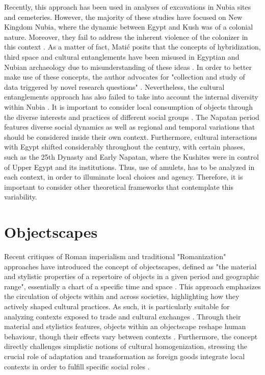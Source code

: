 Recently, this approach has been used in analyses of excavations in Nubia sites and cemeteries. However, the majority of these studies have focused on New Kingdom Nubia, where the dynamic between Egypt and Kush was of a colonial nature. Moreover, they fail to address the inherent violence of the colonizer in this context \parencite[p.~72-73]{matićPostcolonialismReverseDiscourse2023}. As a matter of fact, Matić posits that the concepts of hybridization, third space and cultural entanglements have been misused in Egyptian and Nubian archaeology due to misunderstanding of these ideas \parencite[p.~61, 74]{matićPostcolonialismReverseDiscourse2023}. In order to better make use of these concepts, the author advocates for "collection and study of data triggered by novel research questions" \parencite[p.~74]{matićPostcolonialismReverseDiscourse2023}. Nevertheless, the cultural entanglements approach has also failed to take into account the internal diversity within Nubia \parencites[p.~5]{lemosMaterialCultureColonization2020}. It is important to consider local consumption of objects through the diverse interests and practices of different social groups \parencites[p.~57]{dietlerConsumption2010}. The Napatan period features diverse social dynamics as well as regional and temporal variations that should be considered inside their own context. Furthermore, cultural interactions with Egypt shifted considerably throughout the century, with certain phases, such as the 25th Dynasty and Early Napatan, where the Kushites were in control of Upper Egypt and its institutions. Thus, use of amulets, has to be analyzed in each context, in order to illuminate local choices and agency. Therefore, it is important to consider other theoretical frameworks that contemplate this variability.


\section{Objectscapes}


Recent critiques of Roman imperialism and traditional "Romanization" approaches have introduced the concept of objectscapes, defined as "the material and stylistic properties of a repertoire of objects in a given period and geographic range", essentially a chart of a specific time and space \parencites[p.~368]{pittsObjectscapesManifestoInvestigating2021}. This approach emphasizes the circulation of objects within and across societies, highlighting how they actively shaped cultural practices. As such, it is particularly suitable for analyzing contexts exposed to trade and cultural exchanges \parencites[p.~7]{pittsRomanObjectRevolution2019}. Through their material and stylistics features, objects within an objectscape reshape human behaviour, though their effects vary between contexts \parencites[p.~197]{versluysObjectscapesMaterialConstitution2017}. Furthermore, the concept directly challenges simplistic notions of cultural homogenization, stressing the crucial role of adaptation and transformation as foreign goods integrate local contexts in order to fulfill specific social roles \parencites[p.~13-14]{pittsRomanObjectRevolution2019}. 


